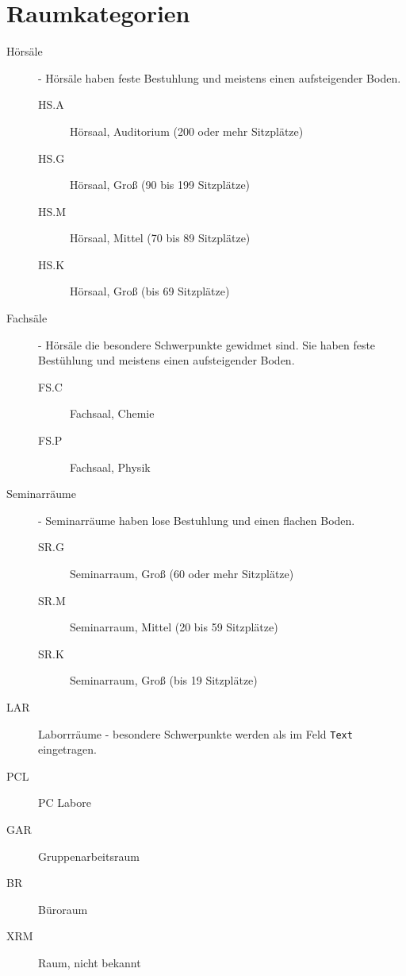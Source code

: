 
\section{Raumkategorien}
\label{sec:rc_list}
\begin{description}
	\item[Hörsäle] - Hörsäle haben feste Bestuhlung und meistens einen aufsteigender Boden.
	\begin{description}
		\item[HS.A] Hörsaal, Auditorium (200 oder mehr Sitzplätze)
		\item[HS.G] Hörsaal, Groß (90 bis 199 Sitzplätze)
		\item[HS.M] Hörsaal, Mittel (70 bis 89 Sitzplätze)
		\item[HS.K] Hörsaal, Groß (bis 69 Sitzplätze)
	\end{description}
	\item[Fachsäle] - Hörsäle die besondere Schwerpunkte gewidmet sind. Sie haben feste Bestühlung und meistens einen aufsteigender Boden.
	\begin{description}
		\item[FS.C] Fachsaal, Chemie
		\item[FS.P] Fachsaal, Physik
	\end{description}
	\item[Seminarräume] - Seminarräume haben lose Bestuhlung und einen flachen Boden.
	\begin{description}
		\item[SR.G] Seminarraum, Groß (60 oder mehr Sitzplätze)
		\item[SR.M] Seminarraum, Mittel (20 bis 59 Sitzplätze)
		\item[SR.K] Seminarraum, Groß (bis 19 Sitzplätze)
	\end{description}
	\item[LAR]	Laborrräume - besondere Schwerpunkte werden als im Feld \texttt{Text} eingetragen.
	\item[PCL]	PC Labore
	\item[GAR]	Gruppenarbeitsraum
	\item[BR] 	Büroraum
	\item[XRM]	Raum, nicht bekannt
\end{description}